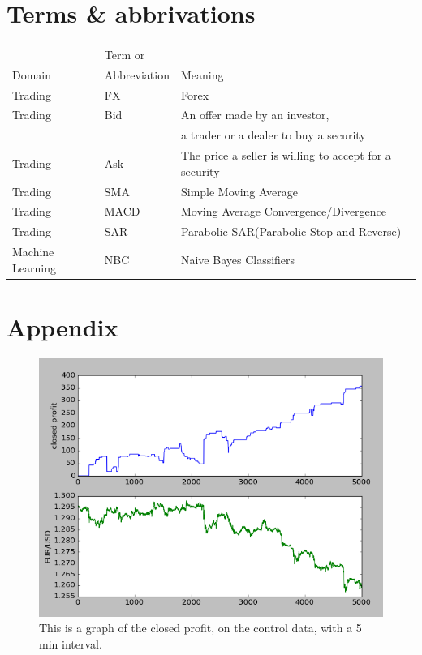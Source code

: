 \documentclass[10pt]{IEEEtran}
\begin{document}
\section{Terms \& abbrivations}
\begin{table}[h!]
\begin{tabularx}{0.5\textwidth}{ l | l | X }
& Term or &\\
Domain & Abbreviation & Meaning\\
\hline
Trading & FX & Forex \\ 
Trading & Bid & An offer made by an investor,\\
& & a trader or a dealer to buy a security\\
Trading & Ask & The price a seller is willing to accept for a security\\
Trading & SMA & Simple Moving Average\\
Trading & MACD & Moving Average Convergence/Divergence\\
Trading & SAR & Parabolic SAR(Parabolic Stop and Reverse)\\
Machine Learning & NBC & Naive Bayes Classifiers\\
\end{tabularx}
\end{table}




\newpage

\section{Appendix}
\pagebreak
\begin{figure}
    \includegraphics[scale = 0.5]{data-96-10000-20.png}
    \caption{This is a graph of the closed profit, on the control data, with a 5 min interval.}
\end{figure}
\end{document}
